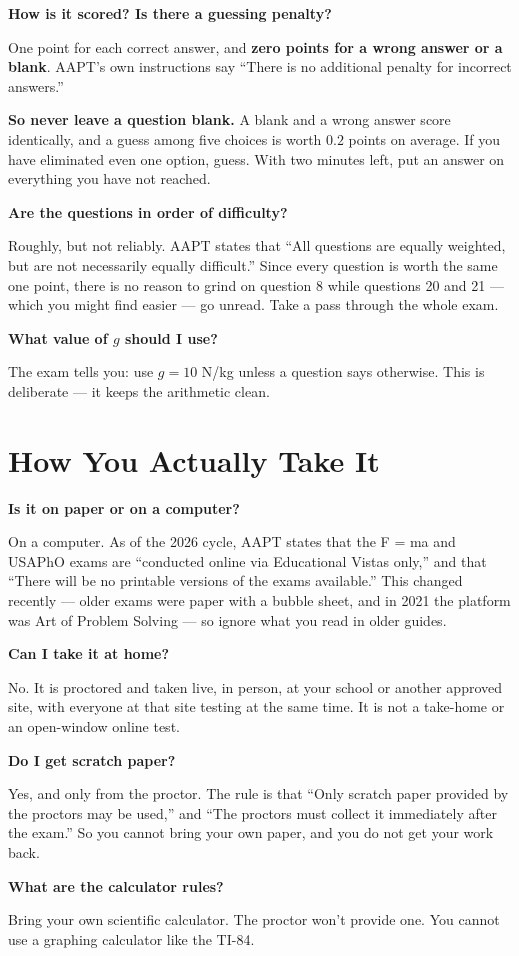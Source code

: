 \documentclass[11pt]{article}
\newcommand{\Q}[1]{\par\medskip\noindent\textbf{\color{qblue}#1}\par\nobreak\vspace{1pt}\nobreak}
\begin{document}
\Q{How is it scored? Is there a guessing penalty?}
One point for each correct answer, and \textbf{zero points for a wrong answer or a blank}.
AAPT's own instructions say ``There is no additional penalty for incorrect answers.''

\begin{tipbox}
\textbf{So never leave a question blank.} A blank and a wrong answer score identically, and
a guess among five choices is worth $0.2$ points on average. If you have eliminated even one
option, guess. With two minutes left, put an answer on everything you have not reached.
\end{tipbox}

\Q{Are the questions in order of difficulty?}
Roughly, but not reliably. AAPT states that ``All questions are equally weighted, but are
not necessarily equally difficult.'' Since every question is worth the same one point,
there is no reason to grind on question 8 while questions 20 and 21 --- which you might find
easier --- go unread. Take a pass through the whole exam.

\Q{What value of $g$ should I use?}
The exam tells you: use $g = 10$ N/kg unless a question says otherwise. This is deliberate
--- it keeps the arithmetic clean.

\section{How You Actually Take It}

\Q{Is it on paper or on a computer?}
On a computer. As of the 2026 cycle, AAPT states that the F = ma and USAPhO exams are
``conducted online via Educational Vistas only,'' and that ``There will be no printable
versions of the exams available.'' This changed recently --- older exams were paper with a
bubble sheet, and in 2021 the platform was Art of Problem Solving --- so ignore what you
read in older guides.

\Q{Can I take it at home?}
No. It is proctored and taken live, in person, at your school or another approved site,
with everyone at that site testing at the same time. It is not a take-home or an
open-window online test.

\Q{Do I get scratch paper?}
Yes, and only from the proctor. The rule is that ``Only scratch paper provided by the
proctors may be used,'' and ``The proctors must collect it immediately after the exam.''
So you cannot bring your own paper, and you do not get your work back.

\Q{What are the calculator rules?}
Bring your own scientific calculator. The proctor won't provide one. You cannot use a
graphing calculator like the TI-84.
\end{document}
